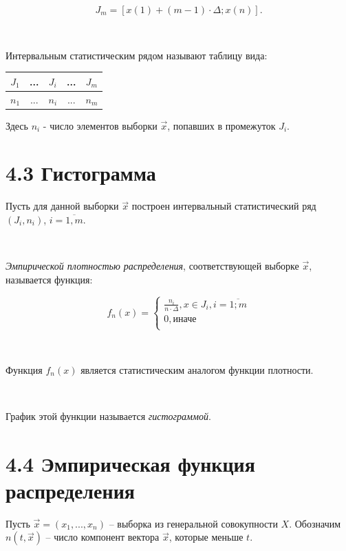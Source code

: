 \documentclass[12pt]{report}
\begin{document}
\begin{equation*}
	J_m = [x(1) + (m - 1) \cdot \Delta; x(n)].
\end{equation*}  

~\

Интервальным статистическим рядом называют таблицу вида:

\begin{table}[htb]
	\centering
	\begin{tabular}{|c|c|c|c|c|}
		\hline
		$J_1$ & ... & $J_i$ & ... & $J_m$ \\
		\hline
		$n_1$ & ... & $n_i$ & ... & $n_m$ \\
		\hline
	\end{tabular}
\end{table}

Здесь $n_i$ - число элементов выборки $\vec{x}$, попавших в промежуток $J_i$.

\section*{4.3 Гистограмма}

Пусть для данной выборки $\vec{x}$ построен интервальный статистический ряд $(J_i, n_i)$, $i = \overline{1, m}$.

~\

\textit{Эмпирической плотностью распределения}, соответствующей выборке $\vec{x}$, называется функция:

\begin{equation*}
	f_{n}(x) =
	\begin{cases}
		\frac{n_i}{n \cdot \Delta}, x \in J_i, i = \overline{1; m} \\
		0, \text{иначе} \\
	\end{cases}
\end{equation*}

~\

Функция $f_{n}(x)$ является статистическим аналогом функции плотности.

~\

График этой функции называется \textit{гистограммой}.

\section*{4.4 Эмпирическая функция распределения}

Пусть $\vec x = (x_1, ..., x_n)$ -- выборка из генеральной совокупности $X$. Обозначим $n(t, \vec x)$ -- число компонент вектора $\vec x$, которые меньше $t$.
\end{document}
